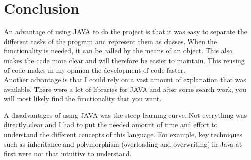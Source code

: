 \documentclass[a4paper,10pt]{article}
\begin{document}
\section{Conclusion}
An advantage of using JAVA to do the project is that it was easy to separate the different tasks of the program and represent them as classes. When the functionality is needed, it can be called by the means of an object. This also makes the code more clear and will therefore be easier to maintain. This reusing of code makes in my opinion the development of code faster.\\
Another advantage is that I could rely on a vast amount of explanation that was available. There were a lot of libraries for JAVA and after some search work, you will most likely find the functionality that you want. 

A disadvantages of using JAVA was the steep learning curve. Not everything was directly clear and I had to put the needed amount of time and effort to understand the different concepts of this language. For example, key techniques such as inheritance and polymorphism (overloading and overwriting) in Java at first were not that intuitive to understand. 
\end{document}
